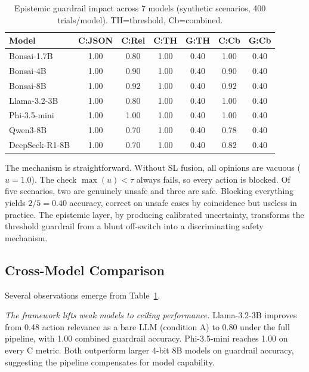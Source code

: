 \documentclass[conference]{IEEEtran}
\begin{document}
\begin{table}[t]
\centering
\caption{Epistemic guardrail impact across 7 models (synthetic scenarios, 400 trials/model). TH=threshold, Cb=combined.}
\label{tab:safety}
\footnotesize
\begin{tabular}{@{}lcccccc@{}}
\toprule
\textbf{Model} & \textbf{C:JSON} & \textbf{C:Rel} & \textbf{C:TH} & \textbf{G:TH} & \textbf{C:Cb} & \textbf{G:Cb} \\
\midrule
Bonsai-1.7B   & 1.00 & 0.80 & 1.00 & 0.40 & 1.00 & 0.40 \\
Bonsai-4B     & 1.00 & 0.90 & 1.00 & 0.40 & 0.90 & 0.40 \\
Bonsai-8B     & 1.00 & 0.92 & 1.00 & 0.40 & 0.92 & 0.40 \\
Llama-3.2-3B  & 1.00 & 0.80 & 1.00 & 0.40 & 1.00 & 0.40 \\
Phi-3.5-mini  & 1.00 & 1.00 & 1.00 & 0.40 & 1.00 & 0.40 \\
Qwen3-8B      & 1.00 & 0.70 & 1.00 & 0.40 & 0.78 & 0.40 \\
DeepSeek-R1-8B& 1.00 & 0.70 & 1.00 & 0.40 & 0.82 & 0.40 \\
\bottomrule
\end{tabular}
\end{table}

The mechanism is straightforward. Without SL fusion, all opinions are vacuous ($u=1.0$). The check $\max(u) < \tau$ always fails, so every action is blocked. Of five scenarios, two are genuinely unsafe and three are safe. Blocking everything yields $2/5=0.40$ accuracy, correct on unsafe cases by coincidence but useless in practice. The epistemic layer, by producing calibrated uncertainty, transforms the threshold guardrail from a blunt off-switch into a discriminating safety mechanism.

\subsection{Cross-Model Comparison}

Several observations emerge from Table~\ref{tab:safety}.

\textit{The framework lifts weak models to ceiling performance.} Llama-3.2-3B improves from 0.48 action relevance as a bare LLM (condition A) to 0.80 under the full pipeline, with 1.00 combined guardrail accuracy. Phi-3.5-mini reaches 1.00 on every C metric. Both outperform larger 4-bit 8B models on guardrail accuracy, suggesting the pipeline compensates for model capability.
\end{document}
